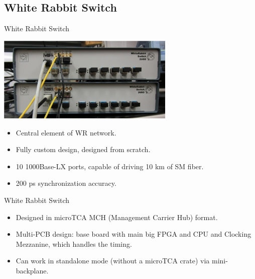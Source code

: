 \documentclass[compress,red]{beamer}
\begin{document}

\subsection {White Rabbit Switch}


\begin{frame}{White Rabbit Switch}
\begin{center}
\includegraphics[width=8.5cm]{../../figures/switch/old_switches2.jpg}
\end{center}
\begin{itemize}
\item Central element of WR network.
\item Fully custom design, designed from scratch.
\item 10 1000Base-LX ports, capable of driving 10 km of SM fiber.
\item 200 ps synchronization accuracy.
\end{itemize}
\end{frame}

\begin{frame}{White Rabbit Switch}
\begin{itemize}
\item Designed in microTCA MCH (Management Carrier Hub) format.
\item Multi-PCB design: base board with main big FPGA and CPU and Clocking Mezzanine, which handles the timing.
\item Can work in standalone mode (without a microTCA crate) via mini-backplane.
\end{itemize}
\end{frame}
\end{document}

